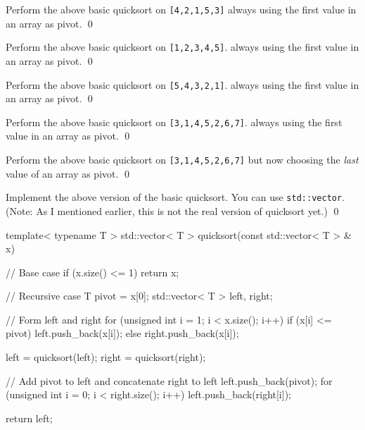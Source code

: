 \newpage
\begin{ex}
Perform the above basic quicksort on \verb![4,2,1,5,3]!
always using the first value in an array as pivot.
\qed
\end{ex}


\newpage
\begin{ex}
Perform the above basic quicksort on \verb![1,2,3,4,5]!.
always using the first value in an array as pivot.
\qed
\end{ex}


\newpage
\begin{ex}
Perform the above basic quicksort on \verb![5,4,3,2,1]!.
always using the first value in an array as pivot.
\qed
\end{ex}


\newpage
\begin{ex}
Perform the above basic quicksort on \verb![3,1,4,5,2,6,7]!.
always using the first value in an array as pivot.
\mbox{}\qed
\end{ex}

\newpage
\begin{ex}
Perform the above basic quicksort on \verb![3,1,4,5,2,6,7]! but
now choosing the \textit{last} value of an array as pivot.
\qed
\end{ex}


\newpage
\begin{ex}
Implement the above version of the basic quicksort.
You can use \verb!std::vector!.
(Note: As I mentioned earlier, this is not the real version of quicksort yet.)
\qed 
\end{ex}

\begin{console}[commandchars=\~\!\@]
template< typename T >
std::vector< T > quicksort(const std::vector< T > & x)
{
    // Base case
    if (x.size() <= 1) return x;

    // Recursive case
    T pivot = x[0];
    std::vector< T > left, right;
 
    // Form left and right
    for (unsigned int i = 1; i < x.size(); i++)
    {
        if (x[i] <= pivot)
        {
            left.push_back(x[i]);
        }
        else
        {
            right.push_back(x[i]);
        }
    }

    left = quicksort(left);
    right = quicksort(right);
    
    // Add pivot to left and concatenate right to left
    left.push_back(pivot);
    for (unsigned int i = 0; i < right.size(); i++)
    {
        left.push_back(right[i]);
    }
    
    return left;
}
\end{console}
